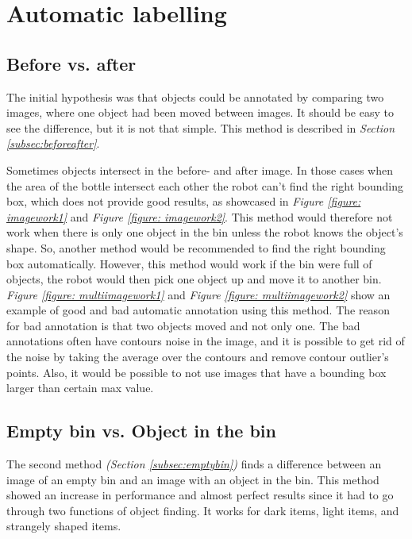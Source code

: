 \section{Automatic labelling}
\subsection{Before vs. after}
The initial hypothesis was that objects could be annotated by comparing two images, where one object had been moved between images. It should be easy to see the difference, but it is not that simple. This method is described in \textit{Section \ref{subsec:beforeafter}}.

Sometimes objects intersect in the before- and after image. In those cases when the area of the bottle intersect each other the robot can't find the right bounding box, which does not provide good results, as showcased in \textit{Figure \ref{figure: imagework1}} and \textit{Figure \ref{figure: imagework2}}. This method would therefore not work when there is only one object in the bin unless the robot knows the object's shape. So, another method would be recommended to find the right bounding box automatically. 
However, this method would work if the bin were full of objects, the robot would then pick one object up and move it to another bin. \textit{Figure \ref{figure: multiimagework1}} and \textit{Figure \ref{figure: multiimagework2}} show an example of good and bad automatic annotation using this method. The reason for bad annotation is that two objects moved and not only one. The bad annotations often have contours noise in the image, and it is possible to get rid of the noise by taking the average over the contours and remove contour outlier’s points. Also, it would be possible to not use images that have a bounding box larger than certain max value. 

\subsection{Empty bin vs. Object in the bin}
The second method \textit{(Section \ref{subsec:emptybin})} finds a difference between an image of an empty bin and an image with an object in the bin. 
This method showed an increase in performance and almost perfect results since it had to go through two functions of object finding. It works for dark items, light items, and strangely shaped items. 

